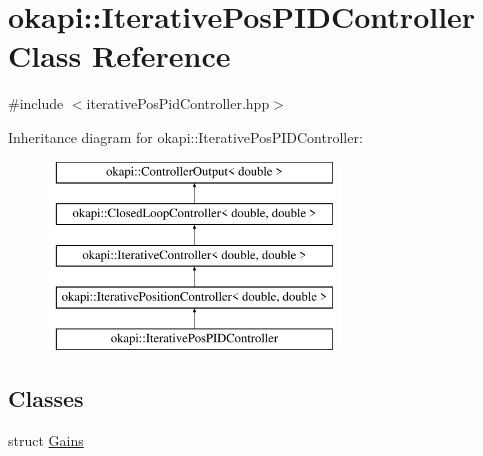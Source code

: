 \hypertarget{classokapi_1_1IterativePosPIDController}{}\section{okapi\+::Iterative\+Pos\+P\+I\+D\+Controller Class Reference}
\label{classokapi_1_1IterativePosPIDController}


{\ttfamily \#include $<$iterative\+Pos\+Pid\+Controller.\+hpp$>$}

Inheritance diagram for okapi\+::Iterative\+Pos\+P\+I\+D\+Controller\+:\begin{figure}[H]
\begin{center}
\leavevmode
\includegraphics[height=5.000000cm]{classokapi_1_1IterativePosPIDController}
\end{center}
\end{figure}
\subsection*{Classes}
\begin{DoxyCompactItemize}
\item 
struct \mbox{\hyperlink{structokapi_1_1IterativePosPIDController_1_1Gains}{Gains}}
\end{DoxyCompactItemize}
